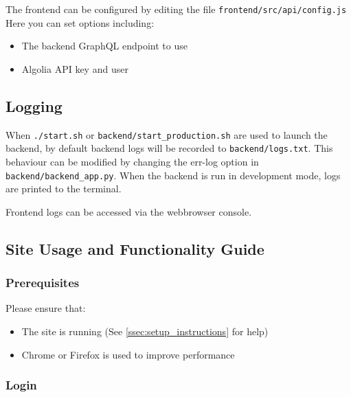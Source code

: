 \documentclass[../report.tex]{subfiles}
\begin{document}
The frontend can be configured by editing the file \verb|frontend/src/api/config.js| Here you can set options including:
\begin{itemize}
    \item The backend GraphQL endpoint to use
    \item Algolia API key and user
\end{itemize}

\subsection{Logging}

When \verb|./start.sh| or \verb|backend/start_production.sh| are used to launch the backend, by default backend logs will be recorded to \verb|backend/logs.txt|.
This behaviour can be modified by changing the err-log option in \verb|backend/backend_app.py|.
When the backend is run in development mode, logs are printed to the terminal.

Frontend logs can be accessed via the webbrowser console.

\newpage

\subsection{Site Usage and Functionality Guide}

\subsubsection{Prerequisites}

Please ensure that:
\begin{itemize}
    \item The site is running (See \cref{ssec:setup_instructions} for help)
    \item Chrome or Firefox is used to improve performance
\end{itemize}

\subsubsection{Login}
\end{document}
